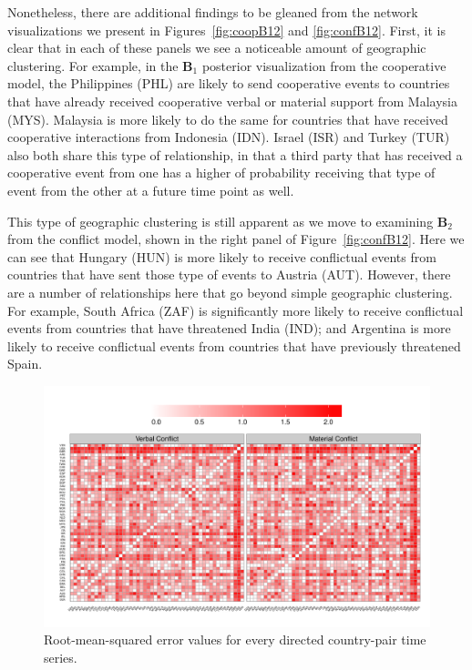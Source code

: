 \documentclass[3p,times,twocolumn,authoryear,12pt]{elsarticle}
\newcommand{\bl}[1]{{\mathbf #1}}
\begin{document}
Nonetheless, there are additional findings to be gleaned from the network visualizations we present in Figures~\ref{fig:coopB12} and \ref{fig:confB12}. First, it is clear that in each of these panels we see a noticeable amount of geographic clustering. For example, in the $\bl B_1$ posterior visualization from the cooperative model, the Philippines (PHL) are likely to send cooperative events to countries that have already received cooperative verbal or material support from Malaysia (MYS). Malaysia is more likely to do the same for countries that have received cooperative interactions from Indonesia (IDN). Israel (ISR) and Turkey (TUR) also both share this type of relationship, in that a third party that has received a cooperative event from one has a higher of probability receiving that type of event from the other at a future time point as well. 

This type of geographic clustering is still apparent as we move to examining $\bl B_2$ from the  conflict model, shown in the right panel of Figure~\ref{fig:confB12}. Here we can see that Hungary (HUN) is more likely to receive conflictual events from countries that have sent those type of events to Austria (AUT). However, there are a number of relationships here that go beyond simple geographic clustering. For example, South Africa (ZAF) is significantly more likely to receive conflictual events from countries that have threatened India (IND); and Argentina is more likely to receive conflictual events from countries that have previously threatened Spain. 

\begin{figure}[!ht]
	\centering
			\includegraphics[width=.8\textwidth]{Conf_iperf}
	\caption{Root-mean-squared error values for every directed country-pair time series.}
	\label{fig:perf}
\end{figure}
\end{document}
